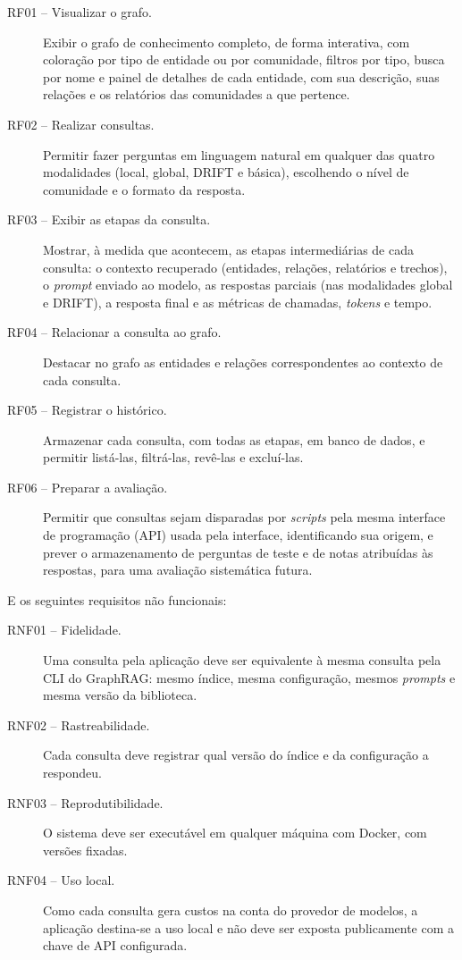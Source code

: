 \begin{description}
    \item[RF01 -- Visualizar o grafo.] Exibir o grafo de conhecimento completo, de forma interativa, com coloração por tipo de entidade ou por comunidade, filtros por tipo, busca por nome e painel de detalhes de cada entidade, com sua descrição, suas relações e os relatórios das comunidades a que pertence.
    \item[RF02 -- Realizar consultas.] Permitir fazer perguntas em linguagem natural em qualquer das quatro modalidades (local, global, DRIFT e básica), escolhendo o nível de comunidade e o formato da resposta.
    \item[RF03 -- Exibir as etapas da consulta.] Mostrar, à medida que acontecem, as etapas intermediárias de cada consulta: o contexto recuperado (entidades, relações, relatórios e trechos), o \textit{prompt} enviado ao modelo, as respostas parciais (nas modalidades global e DRIFT), a resposta final e as métricas de chamadas, \textit{tokens} e tempo.
    \item[RF04 -- Relacionar a consulta ao grafo.] Destacar no grafo as entidades e relações correspondentes ao contexto de cada consulta.
    \item[RF05 -- Registrar o histórico.] Armazenar cada consulta, com todas as etapas, em banco de dados, e permitir listá-las, filtrá-las, revê-las e excluí-las.
    \item[RF06 -- Preparar a avaliação.] Permitir que consultas sejam disparadas por \textit{scripts} pela mesma interface de programação (API) usada pela interface, identificando sua origem, e prever o armazenamento de perguntas de teste e de notas atribuídas às respostas, para uma avaliação sistemática futura.
\end{description}

E os seguintes requisitos não funcionais:

\begin{description}
    \item[RNF01 -- Fidelidade.] Uma consulta pela aplicação deve ser equivalente à mesma consulta pela CLI do GraphRAG: mesmo índice, mesma configuração, mesmos \textit{prompts} e mesma versão da biblioteca.
    \item[RNF02 -- Rastreabilidade.] Cada consulta deve registrar qual versão do índice e da configuração a respondeu.
    \item[RNF03 -- Reprodutibilidade.] O sistema deve ser executável em qualquer máquina com Docker, com versões fixadas.
    \item[RNF04 -- Uso local.] Como cada consulta gera custos na conta do provedor de modelos, a aplicação destina-se a uso local e não deve ser exposta publicamente com a chave de API configurada.
\end{description}

